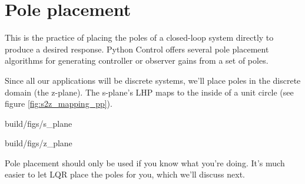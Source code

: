 \section{Pole placement}

This is the practice of placing the poles of a closed-loop \gls{system} directly
to produce a desired response. Python Control offers several pole placement
algorithms for generating controller or observer gains from a set of poles.

Since all our applications will be discrete \glspl{system}, we'll place poles in
the discrete domain (the z-plane). The s-plane's LHP maps to the inside of a
unit circle (see figure \ref{fig:s2z_mapping_pp}).
\begin{bookfigure}
  \begin{minisvg}{2}{build/figs/s_plane}
  \end{minisvg}
  \hfill
  \begin{minisvg}{2}{build/figs/z_plane}
  \end{minisvg}
  \caption{Mapping of complex plane from continuous (left) to discrete (right)}
  \label{fig:s2z_mapping_pp}
\end{bookfigure}

Pole placement should only be used if you know what you're doing. It's much
easier to let LQR place the poles for you, which we'll discuss next.
